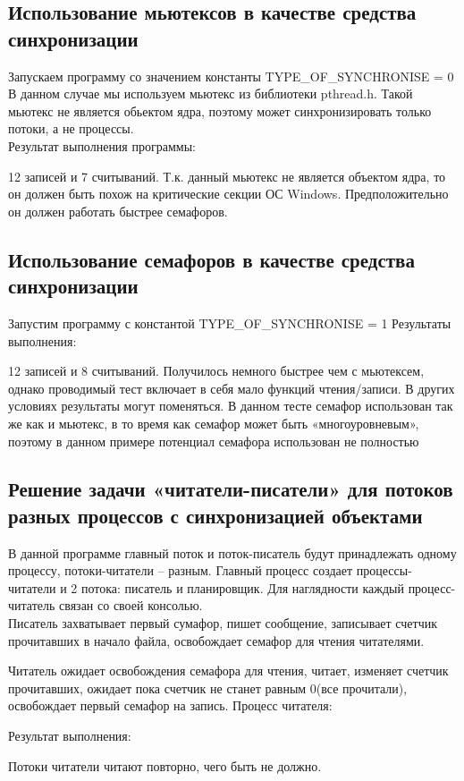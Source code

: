 \documentclass[a4paper]{article}
\begin{document}
\subsection{Использование мьютексов в качестве средства синхронизации}
Запускаем программу со значением константы TYPE\_OF\_SYNCHRONISE = 0
В данном случае мы используем мьютекс из библиотеки pthread.h. Такой мьютекс не является обьектом ядра, поэтому может синхронизировать только потоки, а не процессы.\\

Результат выполнения программы:
	
	12 записей и 7 считываний. Т.к. данный мьютекс не является объектом ядра, то он должен быть похож на критические секции ОС Windows. Предположительно он должен работать быстрее семафоров.

\subsection{Использование семафоров в качестве средства синхронизации}
Запустим программу с константой TYPE\_OF\_SYNCHRONISE = 1
Результаты выполнения:
	
12 записей и 8 считываний. Получилось немного быстрее чем с мьютексем, однако проводимый тест включает в себя мало функций чтения/записи. В других условиях результаты могут поменяться. В данном тесте семафор использован так же как и мьютекс, в то время как семафор может быть «многоуровневым», поэтому в данном примере потенциал семафора использован не полностью

\subsection{Решение задачи «читатели-писатели» для потоков разных процессов с синхронизацией объектами}
В данной программе главный поток и поток-писатель будут принадлежать одному процессу, потоки-читатели – разным. Главный процесс создает процессы-читатели и 2 потока: писатель и планировщик. Для наглядности каждый процесс-читатель связан со своей консолью.\\

Писатель захватывает первый сумафор, пишет сообщение, записывает счетчик прочитавших в начало файла, освобождает семафор для чтения читателями.
	
	Читатель ожидает освобождения семафора для чтения, читает, изменяет счетчик прочитавших, ожидает пока счетчик не станет равным 0(все прочитали), освобождает первый семафор на запись. 
Процесс читателя:
	
Результат выполнения:
	
	Потоки читатели читают повторно, чего быть не должно.
	
\end{document}
